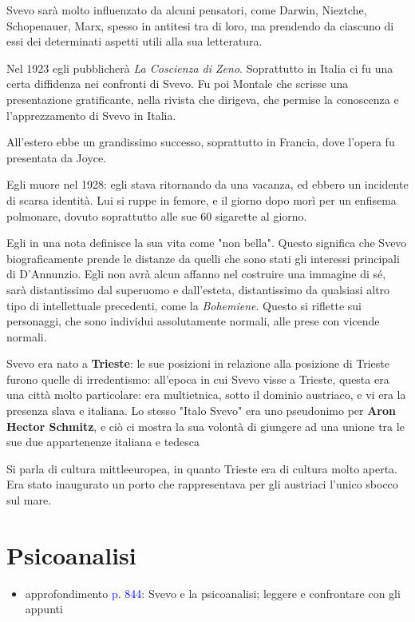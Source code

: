 \documentclass[a4paper, twoside, titlepage]{book}
\newcounter{mar}
\newcommand{\elenco}[1]{%
\begin{itemize}
#1
\end{itemize}}
\renewcommand{\emph}[1]{\textcolor{blue}{#1}}
\begin{document}
Svevo sarà molto influenzato da alcuni pensatori, come Darwin, Nieztche, Schopenauer, Marx, spesso in antitesi tra di loro, ma prendendo da ciascuno di essi dei determinati aspetti utili alla sua letteratura.

Nel 1923 egli pubblicherà \textit{La Coscienza di Zeno}. Soprattutto in Italia ci fu una certa diffidenza nei confronti di Svevo. Fu poi Montale che scrisse una presentazione gratificante, nella rivista che dirigeva, che permise la conoscenza e l'apprezzamento di Svevo in Italia.

All'estero ebbe un grandissimo successo, soprattutto in Francia, dove l'opera fu presentata da Joyce.

Egli muore nel 1928: egli stava ritornando da una vacanza, ed ebbero un incidente di scarsa identità. Lui si ruppe in femore, e il giorno dopo morì per un enfisema polmonare, dovuto soprattutto alle sue 60 sigarette al giorno.

Egli in una nota definisce la sua vita come "non bella". Questo significa che Svevo biograficamente prende le distanze da quelli che sono stati gli interessi principali di D'Annunzio.
Egli non avrà alcun affanno nel costruire una immagine di sé, sarà distantissimo dal superuomo e dall'esteta, distantissimo da qualsiasi altro tipo di intellettuale precedenti, come la \textit{Bohemiene}. Questo si riflette sui personaggi, che sono individui assolutamente normali, alle prese con vicende normali.

Svevo era nato a \textbf{Trieste}: le sue posizioni in relazione alla posizione di Trieste furono quelle di irredentismo: all'epoca in cui Svevo visse a Trieste, questa era una città molto particolare: era multietnica, sotto il dominio austriaco, e vi era la presenza slava e italiana. Lo stesso "Italo Svevo" era uno pseudonimo per \textbf{Aron Hector Schmitz}, e ciò ci mostra la sua volontà di giungere ad una unione tra le sue due appartenenze italiana e tedesca

Si parla di cultura mittleeuropea, in quanto Trieste era di cultura molto aperta. Era stato inaugurato un porto che rappresentava per gli austriaci l'unico sbocco sul mare.

\section{Psicoanalisi}

\elenco{\item approfondimento \emph{p. 844}: Svevo e la psicoanalisi; leggere e confrontare con gli appunti}
\end{document}
